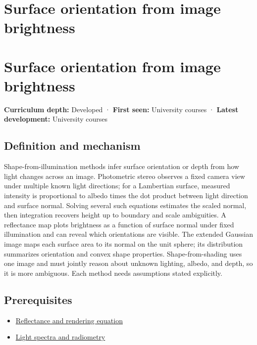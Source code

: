 \hypertarget{appendix-89b2d5b7c9e1}{}
\section*{Surface orientation from image brightness}
\section{Surface orientation from image brightness}\label{appendix-89b2d5b7c9e1-surface-orientation-from-image-brightness}

\textbf{Curriculum depth:} Developed · \textbf{First seen:} University courses · \textbf{Latest development:} University courses

\subsection{Definition and mechanism}\label{appendix-89b2d5b7c9e1-definition-and-mechanism}

Shape-from-illumination methods infer surface orientation or depth from how light changes across an image. Photometric stereo observes a fixed camera view under multiple known light directions; for a Lambertian surface, measured intensity is proportional to albedo times the dot product between light direction and surface normal. Solving several such equations estimates the scaled normal, then integration recovers height up to boundary and scale ambiguities. A reflectance map plots brightness as a function of surface normal under fixed illumination and can reveal which orientations are visible. The extended Gaussian image maps each surface area to its normal on the unit sphere; its distribution summarizes orientation and convex shape properties. Shape-from-shading uses one image and must jointly reason about unknown lighting, albedo, and depth, so it is more ambiguous. Each method needs assumptions stated explicitly.

\subsection{Prerequisites}\label{appendix-89b2d5b7c9e1-prerequisites}

\begin{itemize}
\tightlist
\item
  \hyperref[appendix-96da0b153b77]{Reflectance and rendering equation}
\item
  \hyperref[appendix-215c2570199b]{Light spectra and radiometry}
\end{itemize}

